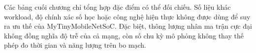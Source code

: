 Các bảng cuối chương chỉ tổng hợp đặc điểm có thể đối chiếu. Số liệu khác workload, độ chính xác số học hoặc công nghệ hiện thực không được dùng để suy ra ưu thế của MyTinyMobileNetSoC. Đặc biệt, thông lượng nhân ma trận cực đại không đồng nghĩa độ trễ của cả mạng, còn số chu kỳ mô phỏng không thay thế phép đo thời gian và năng lượng trên bo mạch.




